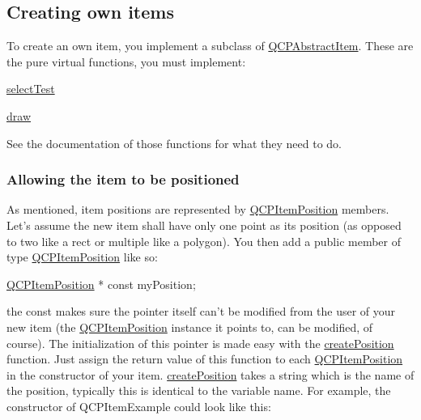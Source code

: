 \hypertarget{class_q_c_p_abstract_item_items-subclassing}{}\subsection{Creating own items}\label{class_q_c_p_abstract_item_items-subclassing}
To create an own item, you implement a subclass of \hyperlink{class_q_c_p_abstract_item}{Q\-C\-P\-Abstract\-Item}. These are the pure virtual functions, you must implement\-: \begin{DoxyItemize}
\item \hyperlink{class_q_c_p_abstract_item_a96d522d10ffc0413b9a366c6f7f0476b}{select\-Test} \item \hyperlink{class_q_c_p_abstract_item_ad0dc056f650c3ca73414e6b4f01674ef}{draw}\end{DoxyItemize}
See the documentation of those functions for what they need to do.\hypertarget{class_q_c_p_abstract_item_items-positioning}{}\subsubsection{Allowing the item to be positioned}\label{class_q_c_p_abstract_item_items-positioning}
As mentioned, item positions are represented by \hyperlink{class_q_c_p_item_position}{Q\-C\-P\-Item\-Position} members. Let's assume the new item shall have only one point as its position (as opposed to two like a rect or multiple like a polygon). You then add a public member of type \hyperlink{class_q_c_p_item_position}{Q\-C\-P\-Item\-Position} like so\-:


\begin{DoxyCode}
\hyperlink{class_q_c_p_item_position}{QCPItemPosition} * \textcolor{keyword}{const} myPosition;
\end{DoxyCode}


the const makes sure the pointer itself can't be modified from the user of your new item (the \hyperlink{class_q_c_p_item_position}{Q\-C\-P\-Item\-Position} instance it points to, can be modified, of course). The initialization of this pointer is made easy with the \hyperlink{class_q_c_p_abstract_item_a75036d39c4d4e2e1a7dd145fff915d32}{create\-Position} function. Just assign the return value of this function to each \hyperlink{class_q_c_p_item_position}{Q\-C\-P\-Item\-Position} in the constructor of your item. \hyperlink{class_q_c_p_abstract_item_a75036d39c4d4e2e1a7dd145fff915d32}{create\-Position} takes a string which is the name of the position, typically this is identical to the variable name. For example, the constructor of Q\-C\-P\-Item\-Example could look like this\-:


